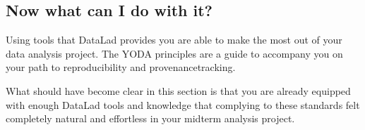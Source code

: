 \subsection{Now what can I do with it?}
\label{\detokenize{basics/101-128-summary_yoda:now-what-can-i-do-with-it}}
\sphinxAtStartPar
Using tools that DataLad provides you are able to make the most out of
your data analysis project. The YODA principles are a guide to accompany
you on your path to reproducibility and provenance\sphinxhyphen{}tracking.

\sphinxAtStartPar
What should have become clear in this section is that you are already
equipped with enough DataLad tools and knowledge that complying to these
standards felt completely natural and effortless in your midterm analysis
project.

\sphinxstepscope


